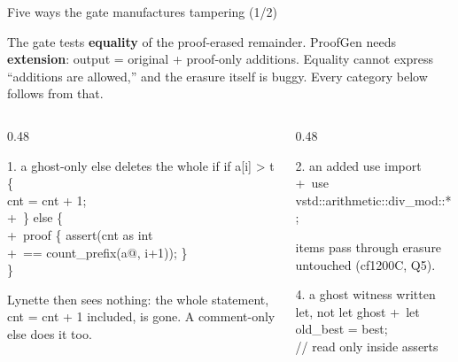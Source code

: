 \documentclass[aspectratio=169,10pt]{beamer}
\newcommand{\code}[1]{{\ttfamily #1}}
\begin{document}
\begin{frame}[fragile]{Five ways the gate manufactures tampering (1/2)}

\begin{callout}[lgAccent]
\scriptsize
The gate tests \textbf{equality} of the proof-erased remainder. ProofGen needs
\textbf{extension}: output = original + proof-only additions. Equality cannot express
``additions are allowed,'' and the erasure itself is buggy. Every category below follows
from that.
\end{callout}

\vspace{8pt}
\begin{columns}[T]
\begin{column}{0.48\textwidth}

\begin{codebox}[lgGrey]{1. a ghost-only \code{else} deletes the whole \code{if}}
{\ttfamily\scriptsize
\phantom{+ }if a[i] > t \{\\
\phantom{+ }\quad cnt = cnt + 1;\\
{\color{lgGreen}+\ }\} else \{\\
{\color{lgGreen}+\ }\quad proof \{ assert(cnt as int\\
{\color{lgGreen}+\ }\qquad == count\_prefix(a@, i+1)); \}\\
\phantom{+ }\}
}
\end{codebox}

\vspace{5pt}
{\scriptsize\color{lgGrey}Lynette then sees nothing: the whole statement, \code{cnt = cnt +
1} included, is gone. A comment-only \code{else} does it too.}

\end{column}
\begin{column}{0.48\textwidth}

\begin{codebox}[lgGrey]{2. an added \code{use} import}
{\ttfamily\scriptsize
{\color{lgGreen}+\ }use vstd::arithmetic::div\_mod::*;
}
\end{codebox}

\vspace{5pt}
{\scriptsize\color{lgGrey}\code{use} items pass through erasure untouched
(\code{cf1200C}, Q5).}

\vspace{14pt}
\begin{codebox}[lgGrey]{4. a ghost witness written \code{let}, not \code{let ghost}}
{\ttfamily\scriptsize
{\color{lgGreen}+\ }let old\_best = best;\\
\phantom{+\ }\quad // read only inside asserts
}
\end{codebox}

\end{column}
\end{columns}

\end{frame}
\end{document}
